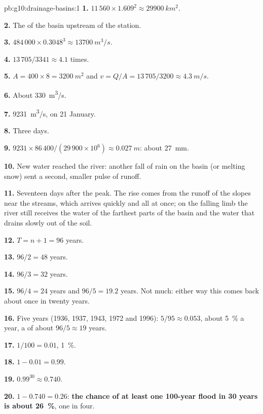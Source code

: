 \begin{solution}{pb:g10:drainage-basins:1}
\textbf{1.} $11\,560 \times 1.609^2 \approx \qty{29900}{km^2}$.

\textbf{2.} The  of the basin upstream of the station.

\textbf{3.} $484\,000 \times 0.3048^3 \approx \qty{13700}{m^3/s}$.

\textbf{4.} $13\,705/3341 \approx 4.1$ times.

\textbf{5.} $A = 400 \times 8 = \qty{3200}{m^2}$ and $v = Q/A = 13\,705/3200
\approx \qty{4.3}{m/s}$.

\textbf{6.} About \qty{330}{m^3/s}.

\textbf{7.} \qty{9231}{m^3/s}, on 21 January.

\textbf{8.} Three days.

\textbf{9.} $9231 \times 86\,400/(29\,900 \times 10^6) \approx
\qty{0.027}{m}$: about \qty{27}{mm}.

\textbf{10.} New water reached the river: another fall of rain on the basin
(or melting snow) sent a second, smaller pulse of runoff.

\textbf{11.} Seventeen days after the peak. The rise comes from the runoff of
the slopes near the streams, which arrives quickly and all at once; on the
falling limb the river still receives the water of the farthest parts of the
basin and the water that drains slowly out of the soil.

\textbf{12.} $T = n + 1 = 96$ years.

\textbf{13.} $96/2 = 48$ years.

\textbf{14.} $96/3 = 32$ years.

\textbf{15.} $96/4 = 24$ years and $96/5 = 19.2$ years. Not much: either way
this  comes back about once in twenty years.

\textbf{16.} Five years (1936, 1937, 1943, 1972 and 1996): $5/95 \approx
0.053$, about \qty{5}{\percent} a year, a  of about
$96/5 \approx 19$ years.

\textbf{17.} $1/100 = 0.01$, \qty{1}{\percent}.

\textbf{18.} $1 - 0.01 = 0.99$.

\textbf{19.} $0.99^{30} \approx 0.740$.

\textbf{20.} $1 - 0.740 = 0.26$: \textbf{the chance of at least one
100-year flood in 30 years is about \qty{26}{\percent}}, one in four.
\end{solution}

